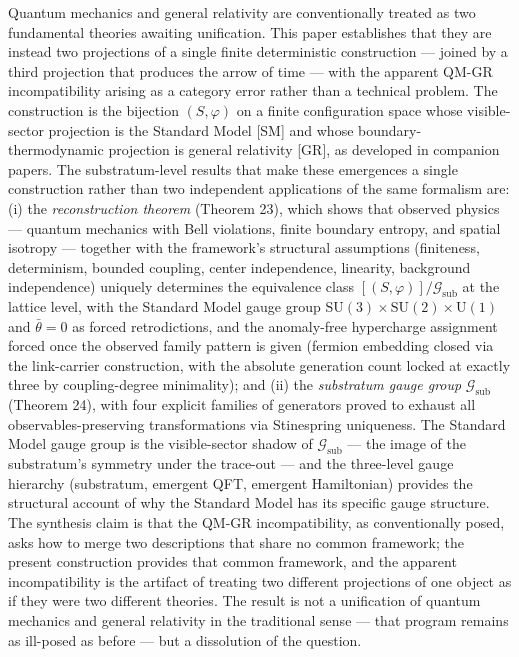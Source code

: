 \documentclass[
]{article}
\begin{document}
Quantum mechanics and general relativity are conventionally treated as
two fundamental theories awaiting unification. This paper establishes
that they are instead two projections of a single finite deterministic
construction --- joined by a third projection that produces the arrow of
time --- with the apparent QM-GR incompatibility arising as a category
error rather than a technical problem. The construction is the bijection
\((S, \varphi)\) on a finite configuration space whose visible-sector
projection is the Standard Model {[}SM{]} and whose
boundary-thermodynamic projection is general relativity {[}GR{]}, as
developed in companion papers. The substratum-level results that make
these emergences a single construction rather than two independent
applications of the same formalism are: (i) the \emph{reconstruction
theorem} (Theorem 23), which shows that observed physics --- quantum
mechanics with Bell violations, finite boundary entropy, and spatial
isotropy --- together with the framework's structural assumptions
(finiteness, determinism, bounded coupling, center independence,
linearity, background independence) uniquely determines the equivalence
class \([(S, \varphi)]/\mathcal{G}_{\text{sub}}\) at the lattice level,
with the Standard Model gauge group
\(\mathrm{SU}(3) \times \mathrm{SU}(2) \times \mathrm{U}(1)\) and
\(\bar\theta = 0\) as forced retrodictions, and the anomaly-free
hypercharge assignment forced once the observed family pattern is given
(fermion embedding closed via the link-carrier construction, with the
absolute generation count locked at exactly three by coupling-degree
minimality); and (ii) the \emph{substratum gauge group}
\(\mathcal{G}_{\text{sub}}\) (Theorem 24), with four explicit families
of generators proved to exhaust all observables-preserving
transformations via Stinespring uniqueness. The Standard Model gauge
group is the visible-sector shadow of \(\mathcal{G}_{\text{sub}}\) ---
the image of the substratum's symmetry under the trace-out --- and the
three-level gauge hierarchy (substratum, emergent QFT, emergent
Hamiltonian) provides the structural account of why the Standard Model
has its specific gauge structure. The synthesis claim is that the QM-GR
incompatibility, as conventionally posed, asks how to merge two
descriptions that share no common framework; the present construction
provides that common framework, and the apparent incompatibility is the
artifact of treating two different projections of one object as if they
were two different theories. The result is not a unification of quantum
mechanics and general relativity in the traditional sense --- that
program remains as ill-posed as before --- but a dissolution of the
question.
\end{document}
